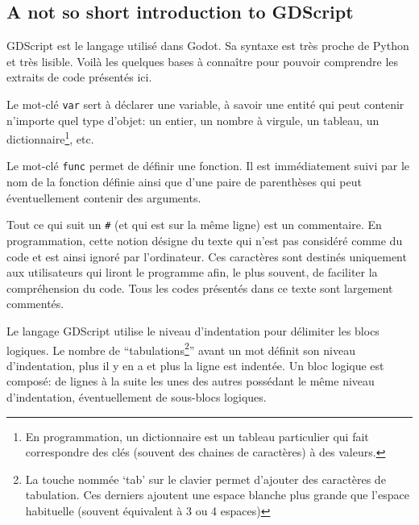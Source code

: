 \subsection{A not so short introduction to GDScript}

GDScript est le langage utilisé dans Godot. Sa syntaxe est très proche de Python et très lisible. Voilà les quelques bases à connaître pour pouvoir comprendre les extraits de code présentés ici.

Le mot-clé \lstinline|var| sert à déclarer une variable, à savoir une entité qui peut contenir n'importe quel type d'objet: un entier, un nombre à virgule, un tableau, un dictionnaire\footnote{En programmation, un dictionnaire est un tableau particulier qui fait correspondre des clés (souvent des chaines de caractères) à des valeurs.}, etc.

Le mot-clé \lstinline|func| permet de définir une fonction. Il est immédiatement suivi par le nom de la fonction définie ainsi que d'une paire de parenthèses qui peut éventuellement contenir des arguments.

Tout ce qui suit un \lstinline|#| (et qui est sur la même ligne) est un commentaire. En programmation, cette notion désigne du texte qui n'est pas considéré comme du code et est ainsi ignoré par l'ordinateur. Ces caractères sont destinés uniquement aux utilisateurs qui liront le programme afin, le plus souvent, de faciliter la compréhension du code. Tous les codes présentés dans ce texte sont largement commentés.

Le langage GDScript utilise le niveau d'indentation pour délimiter les blocs logiques. Le nombre de \enquote{tabulations\footnote{La touche nommée \enquote{tab} sur le clavier permet d'ajouter des caractères de tabulation. Ces derniers ajoutent une espace blanche plus grande que l'espace habituelle (souvent équivalent à 3 ou 4 espaces)}} avant un mot définit son niveau d'indentation, plus il y en a et plus la ligne est indentée. Un bloc logique est composé: de lignes à la suite les unes des autres possédant le même niveau d'indentation, éventuellement de sous-blocs logiques.


